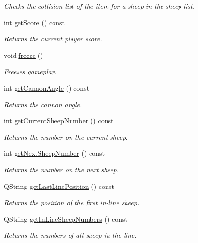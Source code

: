 \begin{DoxyCompactItemize}
\begin{DoxyCompactList}\small\item\em \-Checks the collision list of the item for a sheep in the sheep list. \end{DoxyCompactList}\item 
int \hyperlink{classGame1Scene_a8698a81a65f06e6b07cdf1da92ba9d22}{get\-Score} () const 
\begin{DoxyCompactList}\small\item\em \-Returns the current player score. \end{DoxyCompactList}\item 
void \hyperlink{classGame1Scene_a4983da56ad4c8ef487cdf08f01e99910}{freeze} ()
\begin{DoxyCompactList}\small\item\em \-Freezes gameplay. \end{DoxyCompactList}\item 
int \hyperlink{classGame1Scene_aa76ca6726f4337d2487de02cbd446615}{get\-Cannon\-Angle} () const 
\begin{DoxyCompactList}\small\item\em \-Returns the cannon angle. \end{DoxyCompactList}\item 
int \hyperlink{classGame1Scene_a896bb178aa503a25de5815ec3b4ab6d2}{get\-Current\-Sheep\-Number} () const 
\begin{DoxyCompactList}\small\item\em \-Returns the number on the current sheep. \end{DoxyCompactList}\item 
int \hyperlink{classGame1Scene_a4bfbe53fd1441802bb28f76e6a25fe3e}{get\-Next\-Sheep\-Number} () const 
\begin{DoxyCompactList}\small\item\em \-Returns the number on the next sheep. \end{DoxyCompactList}\item 
\-Q\-String \hyperlink{classGame1Scene_a8156cdf869b5432e79c968f465e381f6}{get\-Last\-Line\-Position} () const 
\begin{DoxyCompactList}\small\item\em \-Returns the position of the first in-\/line sheep. \end{DoxyCompactList}\item 
\-Q\-String \hyperlink{classGame1Scene_ad2aa885de82b171ed8356352f3dbf10e}{get\-In\-Line\-Sheep\-Numbers} () const 
\begin{DoxyCompactList}\small\item\em \-Returns the numbers of all sheep in the line. \end{DoxyCompactList}\end{DoxyCompactItemize}


